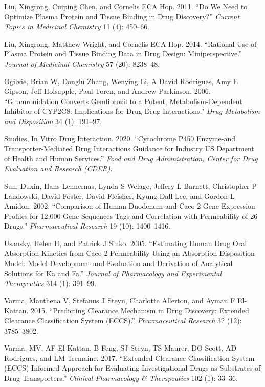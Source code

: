 \documentclass[
  11pt,
  krantz2, a4paper, twoside]{krantz}
\begin{document}
\begin{CSLReferences}
Liu, Xingrong, Cuiping Chen, and Cornelis ECA Hop. 2011. {``Do We Need to Optimize Plasma Protein and Tissue Binding in Drug Discovery?''} \emph{Current Topics in Medicinal Chemistry} 11 (4): 450--66.

Liu, Xingrong, Matthew Wright, and Cornelis ECA Hop. 2014. {``Rational Use of Plasma Protein and Tissue Binding Data in Drug Design: Miniperspective.''} \emph{Journal of Medicinal Chemistry} 57 (20): 8238--48.

Ogilvie, Brian W, Donglu Zhang, Wenying Li, A David Rodrigues, Amy E Gipson, Jeff Holsapple, Paul Toren, and Andrew Parkinson. 2006. {``Glucuronidation Converts Gemfibrozil to a Potent, Metabolism-Dependent Inhibitor of CYP2C8: Implications for Drug-Drug Interactions.''} \emph{Drug Metabolism and Disposition} 34 (1): 191--97.

Studies, In Vitro Drug Interaction. 2020. {``Cytochrome P450 Enzyme-and Transporter-Mediated Drug Interactions Guidance for Industry US Department of Health and Human Services.''} \emph{Food and Drug Administration, Center for Drug Evaluation and Research (CDER)}.

Sun, Duxin, Hans Lennernas, Lynda S Welage, Jeffery L Barnett, Christopher P Landowski, David Foster, David Fleisher, Kyung-Dall Lee, and Gordon L Amidon. 2002. {``Comparison of Human Duodenum and Caco-2 Gene Expression Profiles for 12,000 Gene Sequences Tags and Correlation with Permeability of 26 Drugs.''} \emph{Pharmaceutical Research} 19 (10): 1400--1416.

Usansky, Helen H, and Patrick J Sinko. 2005. {``Estimating Human Drug Oral Absorption Kinetics from Caco-2 Permeability Using an Absorption-Disposition Model: Model Development and Evaluation and Derivation of Analytical Solutions for Ka and Fa.''} \emph{Journal of Pharmacology and Experimental Therapeutics} 314 (1): 391--99.

Varma, Manthena V, Stefanus J Steyn, Charlotte Allerton, and Ayman F El-Kattan. 2015. {``Predicting Clearance Mechanism in Drug Discovery: Extended Clearance Classification System (ECCS).''} \emph{Pharmaceutical Research} 32 (12): 3785--3802.

Varma, MV, AF El-Kattan, B Feng, SJ Steyn, TS Maurer, DO Scott, AD Rodrigues, and LM Tremaine. 2017. {``Extended Clearance Classification System (ECCS) Informed Approach for Evaluating Investigational Drugs as Substrates of Drug Transporters.''} \emph{Clinical Pharmacology \& Therapeutics} 102 (1): 33--36.


\end{CSLReferences}
\end{document}
